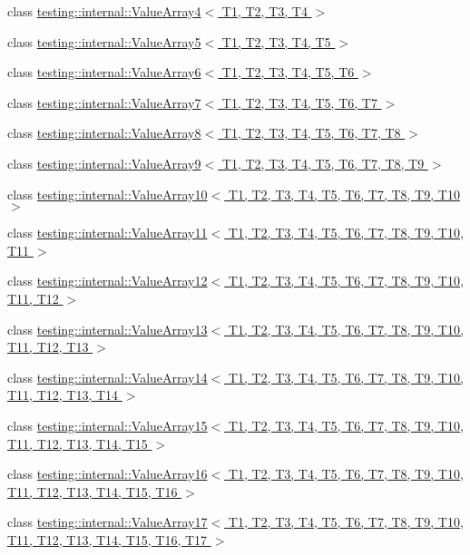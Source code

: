 \begin{DoxyCompactItemize}
\item 
class \hyperlink{classtesting_1_1internal_1_1_value_array4}{testing\-::internal\-::\-Value\-Array4$<$ T1, T2, T3, T4 $>$}
\item 
class \hyperlink{classtesting_1_1internal_1_1_value_array5}{testing\-::internal\-::\-Value\-Array5$<$ T1, T2, T3, T4, T5 $>$}
\item 
class \hyperlink{classtesting_1_1internal_1_1_value_array6}{testing\-::internal\-::\-Value\-Array6$<$ T1, T2, T3, T4, T5, T6 $>$}
\item 
class \hyperlink{classtesting_1_1internal_1_1_value_array7}{testing\-::internal\-::\-Value\-Array7$<$ T1, T2, T3, T4, T5, T6, T7 $>$}
\item 
class \hyperlink{classtesting_1_1internal_1_1_value_array8}{testing\-::internal\-::\-Value\-Array8$<$ T1, T2, T3, T4, T5, T6, T7, T8 $>$}
\item 
class \hyperlink{classtesting_1_1internal_1_1_value_array9}{testing\-::internal\-::\-Value\-Array9$<$ T1, T2, T3, T4, T5, T6, T7, T8, T9 $>$}
\item 
class \hyperlink{classtesting_1_1internal_1_1_value_array10}{testing\-::internal\-::\-Value\-Array10$<$ T1, T2, T3, T4, T5, T6, T7, T8, T9, T10 $>$}
\item 
class \hyperlink{classtesting_1_1internal_1_1_value_array11}{testing\-::internal\-::\-Value\-Array11$<$ T1, T2, T3, T4, T5, T6, T7, T8, T9, T10, T11 $>$}
\item 
class \hyperlink{classtesting_1_1internal_1_1_value_array12}{testing\-::internal\-::\-Value\-Array12$<$ T1, T2, T3, T4, T5, T6, T7, T8, T9, T10, T11, T12 $>$}
\item 
class \hyperlink{classtesting_1_1internal_1_1_value_array13}{testing\-::internal\-::\-Value\-Array13$<$ T1, T2, T3, T4, T5, T6, T7, T8, T9, T10, T11, T12, T13 $>$}
\item 
class \hyperlink{classtesting_1_1internal_1_1_value_array14}{testing\-::internal\-::\-Value\-Array14$<$ T1, T2, T3, T4, T5, T6, T7, T8, T9, T10, T11, T12, T13, T14 $>$}
\item 
class \hyperlink{classtesting_1_1internal_1_1_value_array15}{testing\-::internal\-::\-Value\-Array15$<$ T1, T2, T3, T4, T5, T6, T7, T8, T9, T10, T11, T12, T13, T14, T15 $>$}
\item 
class \hyperlink{classtesting_1_1internal_1_1_value_array16}{testing\-::internal\-::\-Value\-Array16$<$ T1, T2, T3, T4, T5, T6, T7, T8, T9, T10, T11, T12, T13, T14, T15, T16 $>$}
\item 
class \hyperlink{classtesting_1_1internal_1_1_value_array17}{testing\-::internal\-::\-Value\-Array17$<$ T1, T2, T3, T4, T5, T6, T7, T8, T9, T10, T11, T12, T13, T14, T15, T16, T17 $>$}

\end{DoxyCompactItemize}
